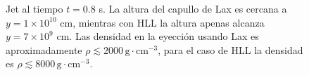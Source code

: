 \documentclass[12pt,a4paper]{book}
\begin{document}
\begin{figure}
\caption{\label{fig:jet_ma_1000_analisis} Jet al tiempo $t = 0.8$ s. La altura del capullo de Lax es cercana a $y = 1 \times 10^{10}$ cm, mientras con HLL la altura apenas alcanza $y = 7 \times 10^{9}$ cm. Las densidad en la eyección usando Lax es aproximadamente $\rho   \lesssim 2000 \, \mathrm{g} \cdot \mathrm{cm}^{-3}$, para el caso de HLL la densidad es $\rho   \lesssim 8000 \, \mathrm{g} \cdot \mathrm{cm}^{-3}$. }
\end{figure}
\end{document}
